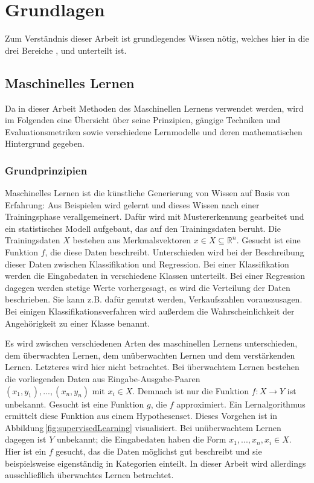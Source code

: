 \chapter{Grundlagen}\label{grundlagen}

Zum Verständnis dieser Arbeit ist grundlegendes Wissen nötig, welches hier in die drei Bereiche ,  und  unterteilt ist.


\section{Maschinelles Lernen}\label{ml-grundlagen}

Da in dieser Arbeit Methoden des Maschinellen Lernens verwendet werden, wird im Folgenden eine Übersicht über seine Prinzipien, gängige Techniken und Evaluationsmetriken sowie verschiedene Lernmodelle und deren mathematischen Hintergrund gegeben.

	\subsection{Grundprinzipien}
	
	Maschinelles Lernen ist die \glqq künstliche\grqq{} Generierung von Wissen auf Basis von Erfahrung: Aus Beispielen wird gelernt und dieses Wissen nach einer Trainingsphase verallgemeinert. Dafür wird mit Mustererkennung gearbeitet und ein statistisches Modell aufgebaut, das auf den Trainingsdaten beruht. Die Trainingsdaten $X$ bestehen aus Merkmalsvektoren  $x \in X \subseteq \mathbb{R}^n$. %
	Gesucht ist eine Funktion $f$, die diese Daten beschreibt. Unterschieden wird bei der Beschreibung dieser Daten zwischen Klassifikation und Regression. Bei einer Klassifikation werden die Eingabedaten in verschiedene Klassen unterteilt. Bei einer Regression dagegen werden stetige Werte vorhergesagt, es wird die Verteilung der Daten beschrieben. Sie kann z.B. dafür genutzt werden, Verkaufszahlen vorauszusagen. Bei einigen Klassifikationsverfahren wird außerdem die Wahrscheinlichkeit der Angehörigkeit zu einer Klasse benannt.
	
	Es wird zwischen verschiedenen Arten des maschinellen Lernens unterschieden, dem überwachten Lernen, dem unüberwachten Lernen und dem verstärkenden Lernen. Letzteres wird hier nicht betrachtet. Bei überwachtem Lernen bestehen die vorliegenden Daten aus Eingabe-Ausgabe-Paaren $(x_1, y_1), ...,(x_n, y_n) \text{ mit } x_i \in X$.%
	 Demnach ist nur die Funktion $f: X \to Y$ ist unbekannt. Gesucht ist eine Funktion $g$, die $f$ approximiert. Ein Lernalgorithmus ermittelt diese Funktion aus einem Hypothesenset. Dieses Vorgehen ist in Abbildung\,\ref{fig:supervisedLearning} visualisiert. Bei unüberwachtem Lernen dagegen ist $Y$ unbekannt; die Eingabedaten haben die Form $x_1, ..., x_n, x_i \in X$. Hier ist ein $f$ gesucht, das die Daten möglichst gut beschreibt und sie beispielsweise eigenständig in Kategorien einteilt. In dieser Arbeit wird allerdings ausschließlich überwachtes Lernen betrachtet.
	
